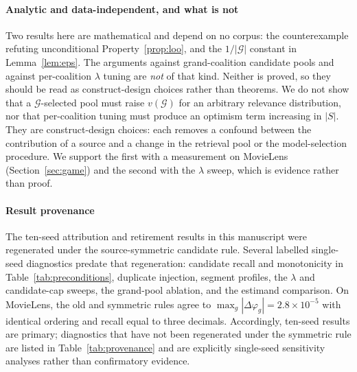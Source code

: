 \documentclass[pdflatex,sn-basic,Numbered]{sn-jnl}
\theoremstyle{plain}
\theoremstyle{definition}
\newcommand{\G}{\mathcal{G}}
\begin{document}
\paragraph{Analytic and data-independent, and what is not}
Two results here are mathematical and depend on no corpus: the counterexample
refuting unconditional Property~\ref{prop:loo}, and the $1/|\G|$ constant in
Lemma~\ref{lem:eps}. The arguments against grand-coalition candidate pools and
against per-coalition $\lambda$ tuning are \emph{not} of that kind. Neither is
proved, so they should be read as construct-design choices rather than
theorems.
We do not show that a $\G$-selected pool must raise $v(\G)$ for an arbitrary
relevance distribution, nor that per-coalition tuning must produce an optimism
term increasing in $|S|$. They are construct-design choices: each removes a
confound between the contribution of a source and a change in the retrieval
pool or the model-selection procedure. We support the first with a measurement
on MovieLens (Section~\ref{sec:game}) and the second with the $\lambda$ sweep,
which is evidence rather than proof.

\paragraph{Result provenance}
The ten-seed attribution and retirement results in this manuscript were
regenerated under the source-symmetric candidate rule. Several labelled
single-seed diagnostics predate that regeneration: candidate recall and
monotonicity in Table~\ref{tab:preconditions}, duplicate injection, segment
profiles, the $\lambda$ and candidate-cap sweeps, the grand-pool ablation, and
the estimand comparison. On MovieLens, the old and symmetric rules agree to
$\max_g|\Delta\varphi_g|=2.8\times10^{-5}$ with identical ordering and recall
equal to three decimals. Accordingly, ten-seed results are primary; diagnostics
that have not been regenerated under the symmetric rule are listed in
Table~\ref{tab:provenance} and are explicitly
single-seed sensitivity analyses rather than confirmatory evidence.
\end{document}
